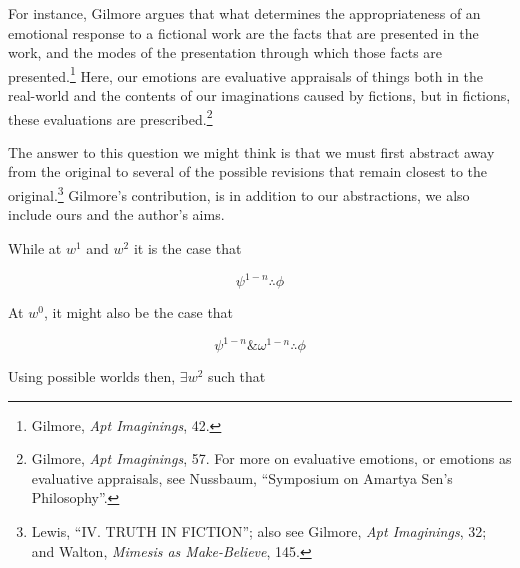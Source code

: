 \documentclass[phdthesis,12pt,final]{wuthesis}
\theoremstyle{definition}
\theoremstyle{definition}
\theoremstyle{definition}
\theoremstyle{definition}
\theoremstyle{remark}
\begin{document}
For instance, Gilmore argues that what determines the appropriateness of an emotional response to a fictional work are the facts that are presented in the work, and the modes of the presentation through which those facts are presented.\footnote{Gilmore, \emph{Apt {Imaginings}}, 42.} Here, our emotions are evaluative appraisals of things both in the real-world and the contents of our imaginations caused by fictions, but in fictions, these evaluations are prescribed.\footnote{Gilmore, \emph{Apt {Imaginings}}, 57. For more on evaluative emotions, or emotions as evaluative appraisals, see Nussbaum, {``Symposium on {Amartya Sen}'s Philosophy''}.}

\noindent The answer to this question we might think is that we must first abstract away from the original to several of the possible revisions that remain closest to the original.\footnote{Lewis, {``{IV}. {TRUTH IN FICTION}''}; also see Gilmore, \emph{Apt {Imaginings}}, 32; and Walton, \emph{Mimesis as {Make-Believe}}, 145.} Gilmore's contribution, is in addition to our abstractions, we also include ours and the author's aims.

While at \(w^{1}\) and \(w^{2}\) it is the case that

\[\psi^{1-n}\therefore\phi\]

\noindent At \(w^{0}\), it might also be the case that

\[\psi^{1-n}\&\omega^{1-n}\therefore\phi\]

\newpage

\noindent Using possible worlds then, \(\exists w^{2}\) such that
\end{document}

